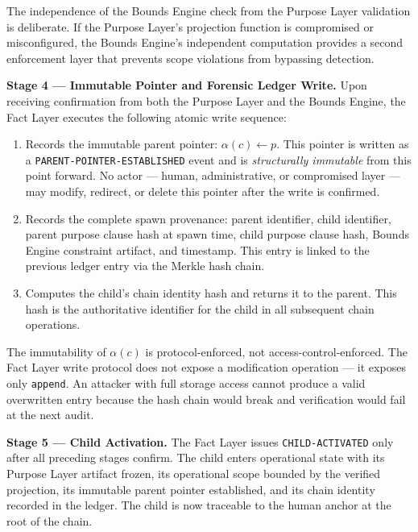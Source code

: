 \documentclass[12pt]{article}
\begin{document}
The independence of the Bounds Engine check from the Purpose Layer validation is deliberate. If the Purpose Layer's projection function is compromised or misconfigured, the Bounds Engine's independent computation provides a second enforcement layer that prevents scope violations from bypassing detection.

\bigskip
\noindent\textbf{Stage 4 — Immutable Pointer and Forensic Ledger Write.} Upon receiving confirmation from both the Purpose Layer and the Bounds Engine, the Fact Layer executes the following atomic write sequence:

\begin{enumerate}
  \item[(FL-W1)] Records the immutable parent pointer: $\alpha(c) \gets p$. This pointer is written as a \texttt{PARENT-POINTER-ESTABLISHED} event and is \emph{structurally immutable} from this point forward. No actor — human, administrative, or compromised layer — may modify, redirect, or delete this pointer after the write is confirmed.

  \item[(FL-W2)] Records the complete spawn provenance: parent identifier, child identifier, parent purpose clause hash at spawn time, child purpose clause hash, Bounds Engine constraint artifact, and timestamp. This entry is linked to the previous ledger entry via the Merkle hash chain.

  \item[(FL-W3)] Computes the child's chain identity hash and returns it to the parent. This hash is the authoritative identifier for the child in all subsequent chain operations.
\end{enumerate}

The immutability of $\alpha(c)$ is protocol-enforced, not access-control-enforced. The Fact Layer write protocol does not expose a modification operation — it exposes only \texttt{append}. An attacker with full storage access cannot produce a valid overwritten entry because the hash chain would break and verification would fail at the next audit.

\bigskip
\noindent\textbf{Stage 5 — Child Activation.} The Fact Layer issues \texttt{CHILD-ACTIVATED} only after all preceding stages confirm. The child enters operational state with its Purpose Layer artifact frozen, its operational scope bounded by the verified projection, its immutable parent pointer established, and its chain identity recorded in the ledger. The child is now traceable to the human anchor at the root of the chain.
\end{document}
